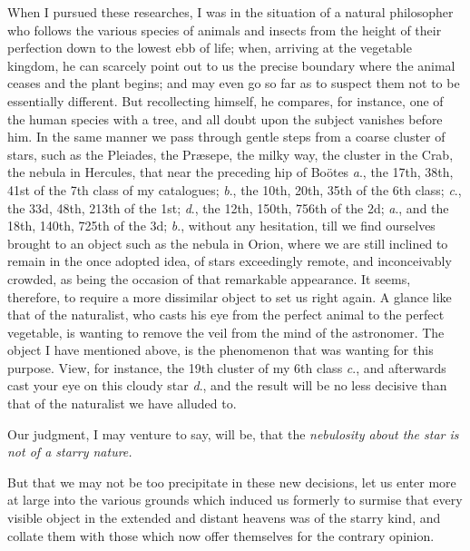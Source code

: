 \documentclass[a4paper, 12pt, oneside, polutonikogreek, english]{article}
\begin{document}
When I pursued these researches, I was in the situation of a natural philosopher who follows the various species of animals and insects from the height of their perfection down to the lowest ebb of life; when, arriving at the vegetable kingdom, he can scarcely point out to us the precise boundary where the animal ceases and the plant begins; and may even go so far as to suspect them not to be essentially different. But recollecting himself, he compares, for instance, one of the human species with a tree, and all doubt upon the subject vanishes before him. In the same manner we pass through gentle steps from a coarse cluster of stars, such as the Pleiades, the Præsepe, the milky way, the cluster in the Crab, the nebula in Hercules, that near the preceding hip of Boötes \emph{a}., the 17th, 38th, 41st of the 7th class of my catalogues; \emph{b}., the 10th, 20th, 35th of the 6th class; \emph{c}., the 33d, 48th, 213th of the 1st; \emph{d}., the 12th, 150th, 756th of the 2d; \emph{a}., and the 18th, 140th, 725th of the 3d; \emph{b}., without any hesitation, till we find ourselves brought to an object such as the nebula in Orion, where we are still inclined to remain in the once adopted idea, of stars exceedingly remote, and inconceivably crowded, as being the occasion of that remarkable appearance. It seems, therefore, to require a more dissimilar object to set us right again. A glance like that of the naturalist, who casts his eye from the perfect animal to the perfect vegetable, is wanting to remove the veil from the mind of the astronomer. The object I have mentioned above, is the phenomenon that was wanting for this purpose. View, for instance, the 19th cluster of my 6th class \emph{c}., and afterwards cast your eye on this cloudy star \emph{d}., and the result will be no less decisive than that of the naturalist we have alluded to.

Our judgment, I may venture to say, will be, that the \emph{nebulosity about the star is not of a starry nature.}

But that we may not be too precipitate in these new decisions, let us enter more at large into the various grounds which induced us formerly to surmise that every visible object in the extended and distant heavens was of the starry kind, and collate them with those which now offer themselves for the contrary opinion.
\end{document}

